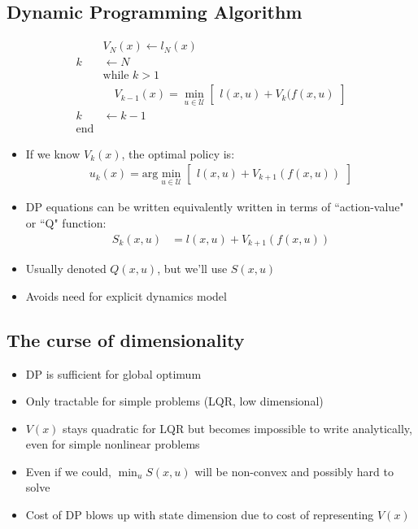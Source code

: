 \documentclass[11pt]{article}
\begin{document}
\subsection{Dynamic Programming Algorithm}
\begin{align*}
    &V_N(x)\leftarrow l_N(x)
    \\
    k &\leftarrow N
    \\
    &\text{while } k>1
    \\
    &\quad V_{k-1}(x) = \min_{u\in \mathcal{U}}\begin{bmatrix}
        l(x,u) + V_k(f(x,u)
    \end{bmatrix}
    \\
    k&\leftarrow k-1
    \\
    \text{end}
\end{align*}
\begin{itemize}
    \item If we know $V_k(x)$, the optimal policy is: 
    \begin{align*}
        u_k(x) = \text{arg}\min_{u\in\mathcal{U}}\begin{bmatrix}
            l(x,u) + V_{k+1}(f(x,u))
        \end{bmatrix}
    \end{align*}
    \item DP equations can be written equivalently written in terms of ``action-value" or ``Q" function:
    \begin{align*}
        S_k(x,u) &=l(x,u) + V_{k+1}(f(x,u))
    \end{align*}
    \item Usually denoted $Q(x,u)$, but we'll use $S(x,u)$
    \item Avoids need for explicit dynamics model
\end{itemize}

\subsection{The curse of dimensionality}
\begin{itemize}
    \item DP is sufficient for global optimum
    \item Only tractable for simple problems (LQR, low dimensional)
    \item $V(x)$ stays quadratic for LQR but becomes impossible to write analytically, even for simple nonlinear problems
    \item Even if we could, $\min_u S(x,u)$ will be non-convex and possibly hard to solve
    \item Cost of DP blows up with state dimension due to cost of representing $V(x)$
\end{itemize}
\end{document}
